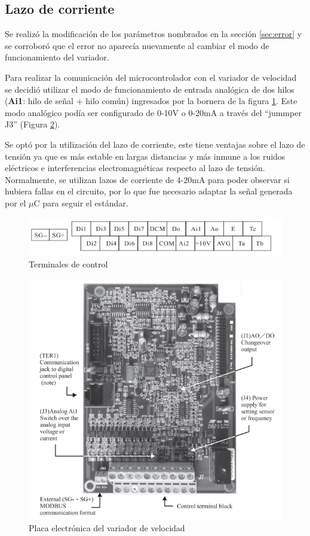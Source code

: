 \subsection{Lazo de corriente} \label{sec:lazoI}

Se realizó la modificación de los parámetros nombrados en la sección \ref{sec:error} y se corroboró que el error no aparecía nuevamente al cambiar el modo de funcionamiento del variador.

Para realizar la comunicación del microcontrolador con el variador de velocidad se decidió utilizar el modo de funcionamiento de entrada analógica de dos hilos (\textbf{Ai1}: hilo de señal + hilo común) ingresados por la bornera de la figura \ref{fig:born}. Este modo analógico podía ser configurado de 0-10V o 0-20mA a través del “jummper J3” (Figura \ref{fig:placals}).

Se optó por la utilización del lazo de corriente, este tiene ventajas sobre el lazo de tensión ya  que es más estable en largas distancias y más inmune a los ruidos eléctricos e interferencias electromagnéticas respecto al lazo de tensión. Normalmente, se utilizan lazos de corriente de 4-20mA para poder observar si hubiera fallas en el circuito, por lo que fue necesario adaptar la señal generada por el $\mu$C para seguir el estándar.



\begin{figure}[h]
	\centering
	\includegraphics[width=0.7\linewidth]{imagenes/terminales.png}
	\caption{Terminales de control}
	\label{fig:born}
\end{figure}

\begin{figure}[htbp]
	\centering
\includegraphics[width=0.7\linewidth]{imagenes/placa_ls}
\caption{Placa electrónica del variador de velocidad}
\label{fig:placals}
\end{figure}

